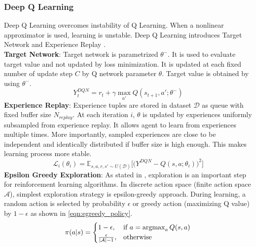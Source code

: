 \subsubsection{Deep Q Learning}
Deep Q Learning overcomes instability of Q Learning. When a nonlinear approximator is used, learning is unstable. Deep Q Learning introduces Target Network and Experience Replay \cite{mnih_human-level_2015, mnih_playing_2013}. \\
\textbf{Target Network}: Target network is parametrized $\theta^-$. It is used to evaluate target value and not updated by loss minimization. It is updated at each fixed number of update step $C$ by Q network parameter $\theta$. Target value is obtained by using $\theta^-$. \\
\begin{equation}
\label{eqn:dqn_ntarget}
Y_t^{DQN} = r_t + \gamma \max_{a'} Q(s_{t+1},a';\theta^-)
\end{equation}
\textbf{Experience Replay}: Experience tuples are stored in dataset $\mathcal{D}$ as queue with fixed buffer size $N_{replay}$. At each iteration $i$, $\theta$ is updated by experiences uniformly subsampled from experience replay. It allows agent to learn from experiences multiple times. More importantly, sampled experiences are close to be independent and identically distributed if buffer size is high enough. This makes learning process more stable. \\
\begin{equation}
\label{eqn:dqn_loss}
\mathcal{L}_i(\theta_i) = \mathbb{E}_{s,a,r,s'\sim U(\mathcal{D})}\Big[\big( Y^{DQN} - Q(s,a;\theta_i) \big) ^ 2 \Big]
\end{equation}
\textbf{Epsilon Greedy Exploration}: As stated in , exploration is an important step for reinforcement learning algorithms. In discrete action space (finite action space $\mathcal{A}$), simplest exploration strategy is epsilon-greedy approach. During learning, a random action is selected by probability $\epsilon$ or greedy action (maximizing Q value) by $1-\epsilon$ as shown in \eqref{eqn:egreedy_policy}. \\
\begin{equation}
\label{eqn:egreedy_policy}
\pi(a|s) = 
\begin{cases}
1-\epsilon,   & \text{if } a = \operatorname{\textup{argmax}}_{a} Q(s, a)\\
\frac{\epsilon}{|\mathcal{A}|-1},     & \text{otherwise}
\end{cases} 
\end{equation}
